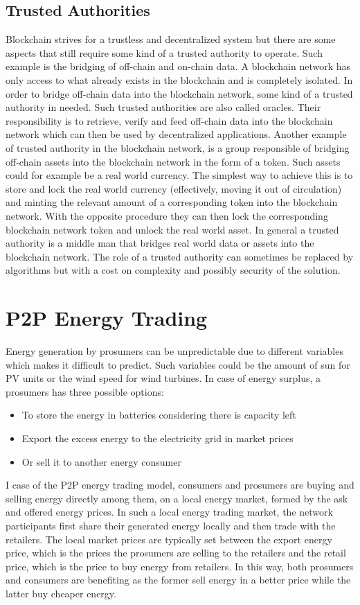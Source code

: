 \subsection{Trusted Authorities}
Blockchain strives for a trustless and decentralized system but there are some aspects that still require some kind of a trusted authority to operate. Such 
example is the bridging of off-chain and on-chain data. A blockchain network has only access to what already exists in the blockchain and is completely isolated. 
In order to bridge off-chain data into the blockchain network, some kind of a trusted authority in needed. Such trusted authorities are also called oracles. Their 
responsibility is to retrieve, verify and feed off-chain data into the blockchain network which can then be used by decentralized applications. Another example of trusted
authority in the blockchain network, is a group responsible of bridging off-chain assets into the blockchain network in the form of a token. Such assets could for example
be a real world currency. The simplest way to achieve this is to store and lock the real world currency (effectively, moving it out of circulation) and minting the relevant amount
of a corresponding token into the blockchain network. With the opposite procedure they can then lock the corresponding blockchain network token and unlock the real world asset.
In general a trusted authority is a middle man that bridges real world data or assets into the blockchain network. The role of a trusted authority can sometimes be replaced by 
algorithms but with a cost on complexity and possibly security of the solution. \cite{oracles}\cite{stablecoins}

\section{P2P Energy Trading}
Energy generation by prosumers can be unpredictable due to different variables which makes it difficult to predict.
Such variables could be the amount of sun for PV units or the wind speed for wind turbines.
In case of energy surplus, a prosumers has three possible options:
\begin{itemize}
    \item To store the energy in batteries considering there is capacity left
    \item Export the excess energy to the electricity grid in market prices
    \item Or sell it to another energy consumer
\end{itemize}
I case of the P2P energy trading model, consumers and prosumers are buying and selling energy directly among them,
on a local energy market, formed by the ask and offered energy prices. In such a local energy trading
market, the network participants first share their generated energy locally and then
trade with the retailers. The local market prices are typically set between the export energy price,
which is the prices the prosumers are selling to the retailers and the retail price, which is the price to buy energy from
retailers. In this way, both prosumers and consumers are benefiting as the former sell energy in a better price while the
latter buy cheaper energy. \cite{Soto2021}

